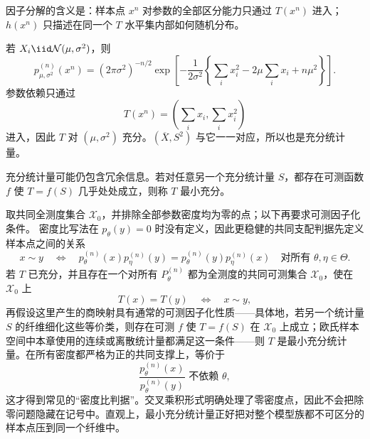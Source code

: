 因子分解的含义是：样本点 $x^n$ 对参数的全部区分能力只通过 $T(x^n)$ 进入；$h(x^n)$ 只描述在同一个 $T$ 水平集内部如何随机分布。

\begin{exbox}[正态样本中的充分统计量]
若 $X_i\iid\mathcal N(\mu,\sigma^2)$，则
\[
 p_{\mu,\sigma^2}^{(n)}(x^n)
 =(2\pi\sigma^2)^{-n/2}
 \exp\!\left[-\frac{1}{2\sigma^2}
 \left\{\sum_i x_i^2-2\mu\sum_i x_i+n\mu^2\right\}\right].
\]
参数依赖只通过
\[
 T(x^n)=\left(\sum_i x_i,\sum_i x_i^2\right)
\]
进入，因此 $T$ 对 $(\mu,\sigma^2)$ 充分。$(\overline X,S^2)$ 与它一一对应，所以也是充分统计量。
\end{exbox}

\begin{definition}[最小充分统计量]
充分统计量可能仍包含冗余信息。若对任意另一个充分统计量 $S$，都存在可测函数 $f$ 使 $T=f(S)$ 几乎处处成立，则称 $T$ 最小充分。
\end{definition}

\begin{proposition}[最小充分的似然比例判据]
取共同全测度集合 $\mathcal X_0$，并排除全部参数密度均为零的点；以下再要求可测因子化条件。
密度比写法在 $p_\theta(y)=0$ 时没有定义，因此更稳健的共同支配判据先定义样本点之间的关系
\begin{equation}\label{eq:math-stat-minimal-sufficiency-cross-product}
 x\sim y
 \quad\Longleftrightarrow\quad
 p_\theta^{(n)}(x)p_\eta^{(n)}(y)
 =p_\theta^{(n)}(y)p_\eta^{(n)}(x)
 \quad\text{对所有 }\theta,\eta\in\Theta.
\end{equation}
若 $T$ 已充分，并且存在一个对所有 $P_\theta^{(n)}$ 都为全测度的共同可测集合 $\mathcal X_0$，使在 $\mathcal X_0$ 上
\begin{equation}\label{eq:math-stat-minimal-sufficiency-fibers}
 T(x)=T(y)
 \quad\Longleftrightarrow\quad
 x\sim y,
\end{equation}
再假设这里产生的商映射具有通常的可测因子化性质——具体地，若另一个统计量 $S$ 的纤维细化这些等价类，则存在可测 $f$ 使 $T=f(S)$ 在 $\mathcal X_0$ 上成立；欧氏样本空间中本章使用的连续或离散统计量都满足这一条件——则 $T$ 是最小充分统计量。在所有密度都严格为正的共同支撑上，等价于
\[
 \frac{p_\theta^{(n)}(x)}{p_\theta^{(n)}(y)}
 \text{ 不依赖 }\theta,
\]
这才得到常见的“密度比判据”。交叉乘积形式明确处理了零密度点，因此不会把除零问题隐藏在记号中。直观上，最小充分统计量正好把对整个模型族都不可区分的样本点压到同一个纤维中。
\end{proposition}

